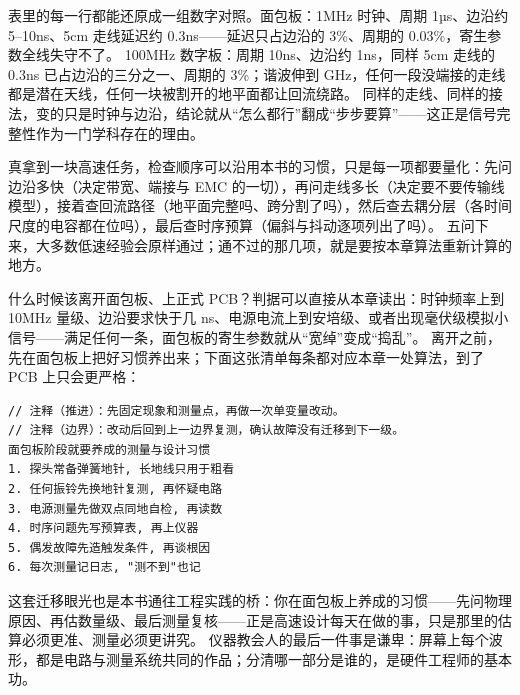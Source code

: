 表里的每一行都能还原成一组数字对照。面包板：1MHz 时钟、周期 1µs、边沿约 5--10ns、5cm 走线延迟约 0.3ns——延迟只占边沿的 3\%、周期的 0.03\%，寄生参数全线失守不了。
100MHz 数字板：周期 10ns、边沿约 1ns，同样 5cm 走线的 0.3ns 已占边沿的三分之一、周期的 3\%；谐波伸到 GHz，任何一段没端接的走线都是潜在天线，任何一块被割开的地平面都让回流绕路。
同样的走线、同样的接法，变的只是时钟与边沿，结论就从“怎么都行”翻成“步步要算”——这正是信号完整性作为一门学科存在的理由。

真拿到一块高速任务，检查顺序可以沿用本书的习惯，只是每一项都要量化：先问边沿多快（决定带宽、端接与 EMC 的一切），再问走线多长（决定要不要传输线模型），接着查回流路径（地平面完整吗、跨分割了吗），然后查去耦分层（各时间尺度的电容都在位吗），最后查时序预算（偏斜与抖动逐项列出了吗）。
五问下来，大多数低速经验会原样通过；通不过的那几项，就是要按本章算法重新计算的地方。

什么时候该离开面包板、上正式 PCB？判据可以直接从本章读出：时钟频率上到 10MHz 量级、边沿要求快于几 ns、电源电流上到安培级、或者出现毫伏级模拟小信号——满足任何一条，面包板的寄生参数就从“宽绰”变成“捣乱”。
离开之前，先在面包板上把好习惯养出来；下面这张清单每条都对应本章一处算法，到了 PCB 上只会更严格：

\begin{lstlisting}
// 注释（推进）：先固定现象和测量点，再做一次单变量改动。
// 注释（边界）：改动后回到上一边界复测，确认故障没有迁移到下一级。
面包板阶段就要养成的测量与设计习惯
1. 探头常备弹簧地针, 长地线只用于粗看
2. 任何振铃先换地针复测, 再怀疑电路
3. 电源测量先做双点同地自检, 再读数
4. 时序问题先写预算表, 再上仪器
5. 偶发故障先造触发条件, 再谈根因
6. 每次测量记日志, "测不到"也记
\end{lstlisting}

这套迁移眼光也是本书通往工程实践的桥：你在面包板上养成的习惯——先问物理原因、再估数量级、最后测量复核——正是高速设计每天在做的事，只是那里的估算必须更准、测量必须更讲究。
仪器教会人的最后一件事是谦卑：屏幕上每个波形，都是电路与测量系统共同的作品；分清哪一部分是谁的，是硬件工程师的基本功。




























